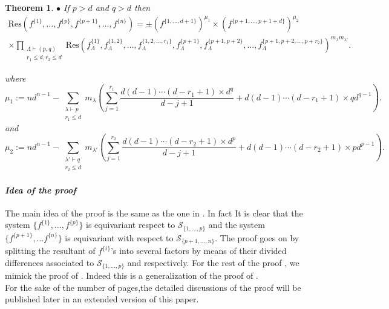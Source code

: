 \documentclass[10pt,a4paper]{amsart}
\newcommand{\Res}{\mathrm{Res}}
\newtheorem{theorem}{Theorem}
\begin{document}
\begin{theorem}
\noindent $\bullet$ If $p> d$ and $q> d$ then
\begin{multline*}
\Res\left(f^{\{1\}},\ldots,f^{\{p\}},f^{\{p+1\}},\ldots,f^{\{n\}}\right)=
 \pm \left(f^{\{1,\ldots,d+1\}}\right)^{\mu_1} \times \left(f^{\{p+1,\ldots,p+1+d\}}\right)^{\mu_2}\\ \times\prod_{\substack{\Lambda\vdash (p,q)\\ r_1\leq d,r_2\leq d}}
\Res\left( f_{\Lambda}^{\{1\}}, f_{\Lambda}^{\{1,2\}}, \ldots, f_{\Lambda}^{\{1,2,\ldots,r_1\}},f_{\Lambda}^{\{p+1\}}, f_{\Lambda}^{\{p+1,p+2\}}, \ldots, f_{\Lambda}^{\{p+1,p+2,\ldots,p+r_2\}} 
\right)^{m_{\lambda}m_{\lambda'}}.
\end{multline*}



where
\begin{equation*}
   \mu_1:=nd^{n-1}-\sum_{ \substack{\lambda\vdash p \\ r_1 \leq d}} m_{\lambda} 
  \left(\sum_{j=1}^{r_1}\dfrac{d(d-1)\cdots(d-r_1+1)\times d^q}{d-j+1}+d(d-1)\cdots(d-r_1+1)\times qd^{q-1} \right).
  \end{equation*}
  and
\begin{equation*}
   \mu_2:=nd^{n-1}-\sum_{ \substack{\lambda'\vdash q \\ r_2 \leq d}} m_{\lambda'} 
  \left(\sum_{j=1}^{r_2}\dfrac{d(d-1)\cdots(d-r_2+1)\times d^p}{d-j+1}+d(d-1)\cdots(d-r_2+1)\times pd^{p-1} \right).
  \end{equation*}

\end{theorem}

\paragraph*{\it {\bf Idea of the proof}}
The main idea of the proof is the same as the one in \cite{BuKa16}. In fact It is clear that the system $\{f^{\{1\}},\ldots, f^{\{p\}} \}$ is equivariant respect to  $\mathcal{S}_{\{1,\ldots,p\}} $ and the system $\{ f^{\{p+1\}},\ldots f^{\{n\}} \}$ is equivariant with respect to $\mathcal{S}_{\{p+1,\ldots,n\}}$. The proof goes on by splitting the resultant of  $f^{{\{i\}}}$'s into several factors by means of their divided differences associated to  $\mathcal{S}_{\{1,\ldots,p\}} $ and respectively. For the rest of the proof , we mimick  the proof of \cite[Theorem 3.3]{BuKa16}. Indeed this is a generalization of the proof of \cite[Theorem 3.3]{BuKa16}. \\
For the sake of the number of pages,the detailed discussions of the proof  will be published later in an extended version of this paper. \\
\end{document}
